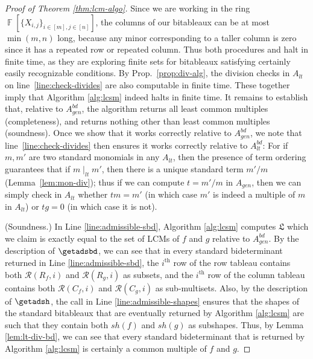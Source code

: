\documentclass[11pt,reqno]{amsart}
\DeclareMathOperator{\F}{\mathbb{F}}
\newcommand{\ltdivides}{\mid_{lt}}
\newcommand{\shapetab}[1]{sh(#1)}
\theoremstyle{definition}
\numberwithin{equation}{section}
\begin{document}
\begin{proof}[Proof of Theorem \ref{thm:lcm-algo}]
Since we are working in the ring $\F[\{X_{i,j}\}_{i \in [m], j \in [n]}]$, the columns of our bitableaux can be at most $\min(m, n)$ long, because any minor corresponding to a taller column is zero since it has a repeated row or repeated column. Thus both procedures \getadsh and \getadsbd halt in finite time, as they are exploring finite sets for bitableaux satisfying certainly easily recognizable conditions. By Prop.~\ref{prop:div-alg}, the division checks in $A_{lt}$ on line~\ref{line:check-divides} are also computable in finite time. These together imply that Algorithm \ref{alg:lcsm} indeed halts in finite time. It remains to establish that, relative to $A_{gen}^{bd}$, the algorithm returns all least common multiples (completeness), and returns nothing other than least common multiples (soundness). Once we show that it works correctly relative to $A^{bd}_{gen}$, we note that line~\ref{line:check-divides} then ensures it works correctly relative to $A^{bd}_{lt}$: For if $m,m'$ are two standard monomials in any $A_{lt}$, then the presence of term ordering guarantees that if $m \ltdivides m'$, then there is a unique standard term $m' / m$ (Lemma~\ref{lem:mon-div}); thus if we can compute $t = m' / m$ in $A_{gen}$, then we can simply check in $A_{lt}$ whether $tm = m'$ (in which case $m'$ is indeed a multiple of $m$ in $A_{lt}$) or $tg = 0$ (in which case it is not). 

(Soundness.) In Line \ref{line:admissible-sbd}, Algorithm \ref{alg:lcsm} computes $\mathfrak{L}$ which we claim is exactly equal to the set of LCMs of $f$ and $g$ relative to $A_{gen}^{bd}$. By the description of $\getadsbd$, we can see that in every standard bideterminant returned in Line \ref{line:admissible-sbd}, the $i^{\text{th}}$ row of the row tableau contains both $\mathcal{R}(R_f, i)$ and $\mathcal{R}(R_g, i)$ as subsets, and the $i^{\text{th}}$ row of the column tableau contains both $\mathcal{R}(C_f, i)$ and $\mathcal{R}(C_g, i)$ as sub-multisets. Also, by the description of $\getadsh$, the call in Line \ref{line:admissible-shapes} ensures that the shapes of the standard bitableaux that are eventually returned by Algorithm \ref{alg:lcsm} are such that they contain both $\shapetab{f}$ and $\shapetab{g}$ as subshapes. Thus, by Lemma \ref{lem:lt-div-bd}, we can see that every standard bideterminant that is returned by Algorithm \ref{alg:lcsm} is certainly a common multiple of $f$ and $g$.


\end{proof}
\end{document}
